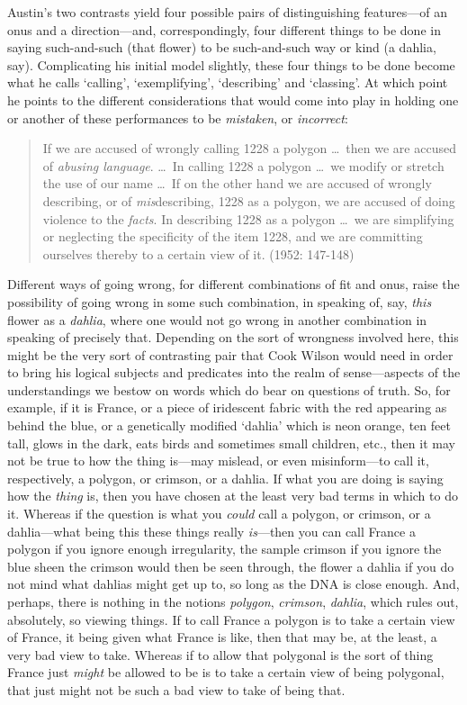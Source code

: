 Austin’s two contrasts yield four possible pairs of distinguishing features---of an onus and a direction---and, correspondingly, four different things to be done in saying such-and-such (that flower) to be such-and-such way or kind (a dahlia, say). Complicating his initial model slightly, these four things to be done become what he calls `calling', `exemplifying', `describing' and `classing'. At which point he points to the different considerations that would come into play in holding one or another of these performances to be \emph{mistaken}, or \emph{incorrect}:
\begin{quote}
	If we are accused of wrongly calling 1228 a polygon \ldots\ then we are accused of \emph{abusing language}. \ldots\ In calling 1228 a polygon \ldots\ we modify or stretch the use of our name \ldots\ If on the other hand we are accused of wrongly describing, or of \emph{mis}describing, 1228 as a polygon, we are accused of doing violence to the \emph{facts}. In describing 1228 as a polygon \ldots\ we are simplifying or neglecting the specificity of the item 1228, and we are committing ourselves thereby to a certain view of it. (1952: 147-148)
\end{quote}
Different ways of going wrong, for different combinations of fit and onus, raise the possibility of going wrong in some such combination, in speaking of, say, \emph{this} flower as a \emph{dahlia}, where one would not go wrong in another combination in speaking of precisely that. Depending on the sort of wrongness involved here, this might be the very sort of contrasting pair that Cook Wilson would need in order to bring his logical subjects and predicates into the realm of sense---aspects of the understandings we bestow on words which do bear on questions of truth. So, for example, if it is France, or a piece of iridescent fabric with the red appearing as behind the blue, or a genetically modified `dahlia' which is neon orange, ten feet tall, glows in the dark, eats birds and sometimes small children, etc., then it may not be true to how the thing is---may mislead, or even misinform---to call it, respectively, a polygon, or crimson, or a dahlia. If what you are doing is saying how the \emph{thing} is, then you have chosen at the least very bad terms in which to do it. Whereas if the question is what you \emph{could} call a polygon, or crimson, or a dahlia---what being this these things really \emph{is}---then you can call France a polygon if you ignore enough irregularity, the sample crimson if you ignore the blue sheen the crimson would then be seen through, the flower a dahlia if you do not mind what dahlias might get up to, so long as the DNA is close enough. And, perhaps, there is nothing in the notions \emph{polygon}, \emph{crimson}, \emph{dahlia}, which rules out, absolutely, so viewing things. If to call France a polygon is to take a certain view of France, it being given what France is like, then that may be, at the least, a very bad view to take. Whereas if to allow that polygonal is the sort of thing France just \emph{might} be allowed to be is to take a certain view of being polygonal, that just might not be such a bad view to take of being that.

